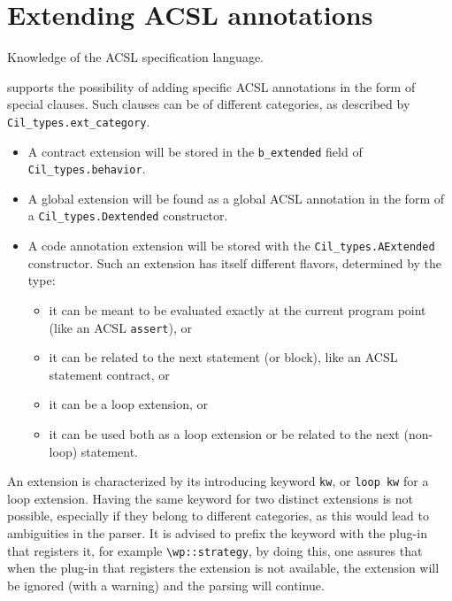

\section{Extending ACSL annotations}\label{sec:extend-acsl-annot}
\begin{prereq}
  Knowledge of the ACSL specification language.
\end{prereq}

\framac supports the possibility of adding specific ACSL annotations in the
form of special clauses.
Such clauses can be of different categories, as described by
\texttt{Cil\_types.ext\_category}.
\begin{itemize}
\item A contract extension will be
stored in the \texttt{b\_extended} field of
\texttt{Cil\_types.behavior}.
\item A global extension will be found as a global ACSL annotation in the form of a
\texttt{Cil\_types.Dextended} constructor.
\item A code annotation extension will be stored with the
\texttt{Cil\_types.AExtended}
constructor. Such an extension has itself
different flavors, determined by the  type:
\begin{itemize}
\item it can be meant to be evaluated exactly at the current program point
 (like an ACSL \texttt{assert}), or
\item it can be related to the next statement (or block), like an ACSL statement contract, or
\item it can be a loop extension, or
\item it can be used both as a loop extension or be related to the next (non-loop) statement.
\end{itemize}
\end{itemize}

An extension is characterized by its introducing keyword \texttt{kw}, or
\texttt{loop kw} for a loop extension. Having the same keyword for two distinct
extensions is not possible, especially if they belong to different categories,
as this would lead to ambiguities in the parser. It is advised to prefix the
keyword with the plug-in that registers it, for example
\lstinline{\wp::strategy}, by doing this, one assures that when the plug-in that
registers the extension is not available, the extension will be ignored (with a
warning) and the parsing will continue.

